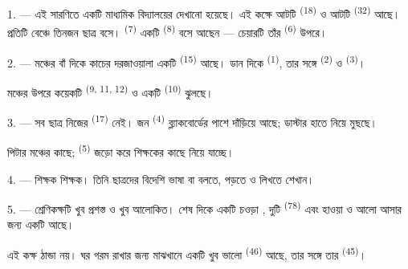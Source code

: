 \VUsaut{2.0mm}
\VUsaut{3.2mm}
\VUsaut{2.6mm}
\VUsaut{3.4mm}
\VUornamento{9pt}
\VUsaut{5.0mm}
\VUsaut{3.0mm}
\VUfilet{16mm}
\VUsaut{5.6mm}

\VUsaut{1.4mm}
\VUsaut{2.2mm}
\VUfilet{20mm}
\VUsaut{6.4mm}

\VUsaut{3.0mm}

1. --- এই সারণিতে একটি মাধ্যমিক বিদ্যালয়ের  দেখানো
হয়েছে। এই কক্ষে আটটি  \textsuperscript{(18)} ও আটটি
 \textsuperscript{(32)} আছে। প্রতিটি বেঞ্চে তিনজন ছাত্র বসে।
 \textsuperscript{(7)} একটি  \textsuperscript{(8)}
বসে আছেন — চেয়ারটি তাঁর  \textsuperscript{(6)} উপরে।

2. --- মঞ্চের বাঁ দিকে কাচের দরজাওয়ালা একটি 
\textsuperscript{(15)} আছে। ডান দিকে  \textsuperscript{(1)},
তার সঙ্গে  \textsuperscript{(2)} ও 
\textsuperscript{(3)}।

মঞ্চের উপরে কয়েকটি  \textsuperscript{(9, 11, 12)} ও একটি
 \textsuperscript{(10)} ঝুলছে।

3. --- সব ছাত্র নিজের  \textsuperscript{(17)} নেই। জন
\textsuperscript{(4)} ব্ল্যাকবোর্ডের পাশে দাঁড়িয়ে আছে; ডাস্টার হাতে নিয়ে
 মুছছে।

পিটার মঞ্চের কাছে;  \textsuperscript{(5)} জড়ো করে
শিক্ষকের কাছে নিয়ে যাচ্ছে।

4. ---  শিক্ষক  শিক্ষক। তিনি ছাত্রদের
বিদেশি ভাষা  বা
 বলতে, পড়তে ও লিখতে শেখান।

5. --- শ্রেণিকক্ষটি খুব প্রশস্ত ও খুব আলোকিত। শেষ দিকে একটি চওড়া
, দুটি  \textsuperscript{(78)} এবং হাওয়া ও আলো
আসার জন্য একটি  আছে।

এই কক্ষ ঠান্ডা নয়। ঘর গরম রাখার জন্য মাঝখানে একটি খুব ভালো
 \textsuperscript{(46)} আছে, তার সঙ্গে তার 
\textsuperscript{(45)}।


